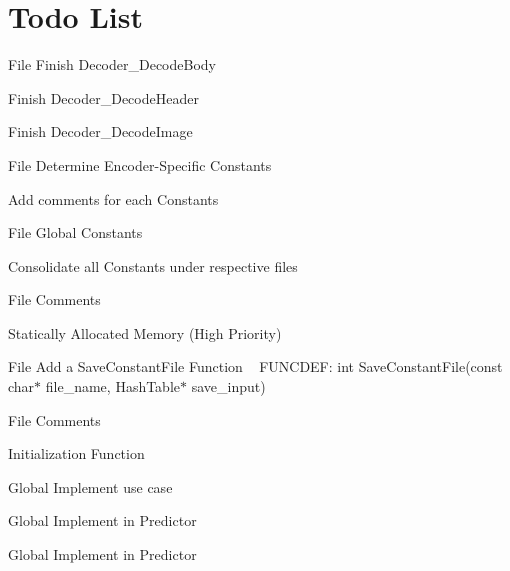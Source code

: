\chapter{Todo List}
\hypertarget{todo}{}\label{todo}

\begin{DoxyRefList}
\item[File \doxylink{decoder_8h}{decoder.h} ]\label{todo__todo000008}%
%
Finish Decoder\+\_\+\+Decode\+Body 



Finish Decoder\+\_\+\+Decode\+Header 



Finish Decoder\+\_\+\+Decode\+Image  
\item[File \doxylink{encoder__constants_8h}{encoder\+\_\+constants.h} ]\label{todo__todo000001}%
%
Determine Encoder-\/\+Specific Constants 



Add comments for each Constants 
\item[File \doxylink{global__constants_8h}{global\+\_\+constants.h} ]\label{todo__todo000002}%
%
Global Constants 



Consolidate all Constants under respective files  
\item[File \doxylink{hash__table_8h}{hash\+\_\+table.h} ]\label{todo__todo000009}%
%
Comments 



Statically Allocated Memory (High Priority)  
\item[File \doxylink{load__constants_8h}{load\+\_\+constants.h} ]\label{todo__todo000003}%
%
Add a Save\+Constant\+File Function ~\newline
FUNCDEF\+: int Save\+Constant\+File(const char\texorpdfstring{$\ast$}{*} file\+\_\+name, Hash\+Table\texorpdfstring{$\ast$}{*} save\+\_\+input)  
\item[File \doxylink{predictor__constants_8h}{predictor\+\_\+constants.h} ]\label{todo__todo000004}%
%
Comments 



Initialization Function  
\item[Global \doxylink{structs__predictor__constants_aa9543722f3ac4cee7db1aa2c20c289e9}{s\+\_\+predictor\+\_\+constants\+::k\+Lossless\+Compression} ]\label{todo__todo000005}%
%
Implement use case  
\item[Global \doxylink{structs__predictor__constants_a28a0b943ff8fd3c6785446e6e6bee86b}{s\+\_\+predictor\+\_\+constants\+::k\+Weight\+Exponent\+Offset\+Flag} ]\label{todo__todo000007}%
%
Implement in Predictor  
\item[Global \doxylink{structs__predictor__constants_adbe6968c0ea7ede4b53717162999a6dd}{s\+\_\+predictor\+\_\+constants\+::k\+Weight\+Initialization} ]\label{todo__todo000006}%
%
Implement in Predictor 
\end{DoxyRefList}